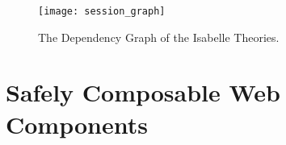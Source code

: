 \documentclass[10pt,DIV16,a4paper,abstract=true,twoside=semi,openright]
{scrreprt}
\begin{document}
\begin{figure}
  \centering
  \texttt{[image: session\_graph]}
  \caption{The Dependency Graph of the Isabelle Theories.\label{fig:session-graph}}
\end{figure}

\clearpage

\chapter{Safely Composable Web Components}
\label{cha:components}





{\small
  
  
}
\end{document}
